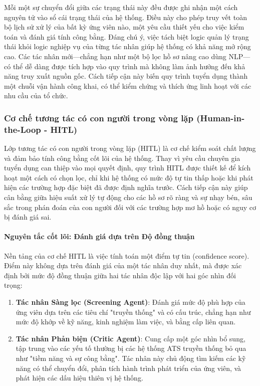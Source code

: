 \documentclass{article}
\begin{document}
\begin{itemize}[topsep=0pt, itemsep=4pt, leftmargin=40pt]
Mỗi một sự chuyển đổi giữa các trạng thái này đều được ghi nhận một cách nguyên tử vào sổ cái trạng thái của hệ thống. Điều này cho phép truy vết toàn bộ lịch sử xử lý của bất kỳ ứng viên nào, một yêu cầu thiết yếu cho việc kiểm toán và đánh giá tính công bằng. Đáng chú ý, việc tách biệt logic quản lý trạng thái khỏi logic nghiệp vụ của từng tác nhân giúp hệ thống có khả năng mở rộng cao. Các tác nhân mới—chẳng hạn như một bộ lọc hồ sơ nâng cao dùng NLP—có thể dễ dàng được tích hợp vào quy trình mà không làm ảnh hưởng đến khả năng truy xuất nguồn gốc. Cách tiếp cận này biến quy trình tuyển dụng thành một chuỗi vận hành công khai, có thể kiểm chứng và thích ứng linh hoạt với các nhu cầu của tổ chức.

\subsubsection{Cơ chế tương tác có con người trong vòng lặp (Human-in-the-Loop - HITL)}
Lớp tương tác có con người trong vòng lặp (HITL) là cơ chế kiểm soát chất lượng và đảm bảo tính công bằng cốt lõi của hệ thống. Thay vì yêu cầu chuyên gia tuyển dụng can thiệp vào mọi quyết định, quy trình HITL được thiết kế để kích hoạt một cách có chọn lọc, chỉ khi hệ thống có mức độ tự tin thấp hoặc khi phát hiện các trường hợp đặc biệt đã được định nghĩa trước. Cách tiếp cận này giúp cân bằng giữa hiệu suất xử lý tự động cho các hồ sơ rõ ràng và sự nhạy bén, sâu sắc trong phán đoán của con người đối với các trường hợp mơ hồ hoặc có nguy cơ bị đánh giá sai.

\paragraph{Nguyên tắc cốt lõi: Đánh giá dựa trên Độ đồng thuận}

Nền tảng của cơ chế HITL là việc tính toán một điểm tự tin (confidence score). Điểm này không dựa trên đánh giá của một tác nhân duy nhất, mà được xác định bởi mức độ đồng thuận giữa hai tác nhân độc lập với hai góc nhìn đối trọng:

\begin{enumerate}[topsep=0pt, itemsep=4pt, leftmargin=40pt, label=\arabic*.]
    \item \textbf{Tác nhân Sàng lọc (Screening Agent)}: Đánh giá mức độ phù hợp của ứng viên dựa trên các tiêu chí "truyền thống" và có cấu trúc, chẳng hạn như mức độ khớp về kỹ năng, kinh nghiệm làm việc, và bằng cấp liên quan.
    \item \textbf{Tác nhân Phản biện (Critic Agent)}: Cung cấp một góc nhìn bổ sung, tập trung vào các yếu tố thường bị các hệ thống ATS truyền thống bỏ qua như "tiềm năng và sự công bằng". Tác nhân này chủ động tìm kiếm các kỹ năng có thể chuyển đổi, phân tích hành trình phát triển của ứng viên, và phát hiện các dấu hiệu thiên vị hệ thống.
\end{enumerate}


\end{itemize}
\end{document}
